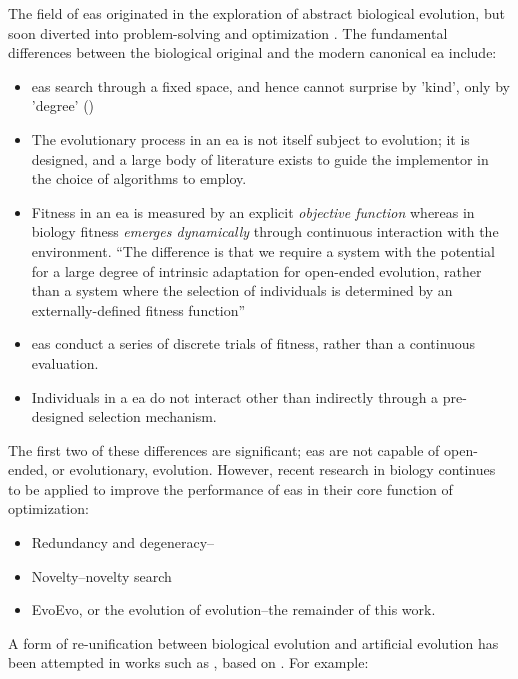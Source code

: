 The field of \glspl{ea} originated in the exploration of abstract biological evolution, but soon diverted into problem-solving and optimization \cite{DeJong2006}. The fundamental differences between the biological original and the modern canonical \gls{ea} include:

\begin{itemize}
\item \Glspl{ea} search through a fixed space, and hence cannot surprise by 'kind', only by 'degree' (\eg \autocite{Nellis2014})
\item The evolutionary process in an \gls{ea} is not itself subject to evolution; it is designed, and a large body of literature exists to guide the implementor in the choice of algorithms to employ.
\item Fitness in an \gls{ea} is measured by an explicit \emph{objective function} whereas in biology fitness \emph{emerges dynamically} through continuous interaction with the environment. ``The difference is that we require a system with the potential for a large degree of intrinsic adaptation for open-ended evolution, rather than a system where the selection of individuals is determined by an externally-defined fitness function'' \autocite{Taylor2001}
\item \Glspl{ea} conduct a series of discrete trials of fitness, rather than a continuous evaluation.
\item Individuals in a \gls{ea} do not interact other than indirectly through a pre-designed selection mechanism.
\end{itemize}

The first two of these differences are significant; \glspl{ea} are not capable of open-ended, or evolutionary, evolution. However, recent research in biology continues to be applied to improve the performance of \glspl{ea} in their core function of optimization:
\begin{itemize}
	\item Redundancy and degeneracy-- \eg \autocite{Whitacre:2010qy}
	\item Novelty--\eg novelty search \autocite{Lehman:2008cr}
	\item EvoEvo, or the evolution of evolution--\eg the remainder of this work.
\end{itemize}

A form of re-unification between biological evolution and artificial evolution has been attempted in works such as \autocite{Paixao2015}, based on . For example: 

